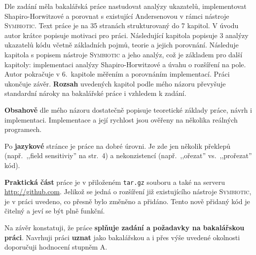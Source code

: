 


\newcommand{\symb}{\textsc{Symbiotic}\xspace}



Dle zadání měla bakalářská práce nastudovat analýzy ukazatelů, implementovat
Shapiro-Horwitzové a porovnat s existující Andersenovou v rámci nástroje
\symb. Text práce je na 35 stranách strukturovaný do 7 kapitol.  V úvodu autor
krátce popisuje motivaci pro práci.  Následující kapitola popisuje 3 analýzy
ukazatelů kódu včetně základních pojmů, teorie a jejich porovnání.
Následuje kapitola s popisem nástroje \symb a jeho analýz, což je základem pro
další kapitoly: implementaci analýzy Shapiro-Horwitzové a úvahu o rozšíření na
pole. Autor pokračuje v 6.\ kapitole měřením a porovnáním implementací. Práci
ukončuje závěr.  \textbf{Rozsah} uvedených kapitol podle mého názoru převyšuje
standardní nároky na bakalářské práce i vzhledem k zadání.

\textbf{Obsahově} dle mého názoru dostatečně popisuje teoretické základy
práce, návrh i implementaci. Implementace a její rychlost jsou ověřeny na
několika reálných programech.

Po \textbf{jazykové} stránce je práce na dobré úrovni. Je zde jen několik
překlepů (např.\ ,,field sensitiviy'' na str.\ 4) a nekonzistencí (např.\
,,ořezat'' vs.\ ,,prořezat'' kód).

\textbf{Praktická část} práce je v přiloženém \texttt{tar.gz} souboru a také na
serveru \url{http://github.com}. Jelikož se jedná o rozšíření již existujícího
nástroje \symb, je v práci uvedeno, co přesně bylo změněno a přidáno.  Tento
nově přidaný kód je čitelný a jeví se být plně funkční.

Na závěr konstatuji, že práce \textbf{splňuje zadání a požadavky na
bakalářskou práci}. Navrhuji práci \textbf{uznat} jako bakalářskou a i přes
výše uvedené okolnosti doporučuji hodnocení stupněm A.

\botinfo


